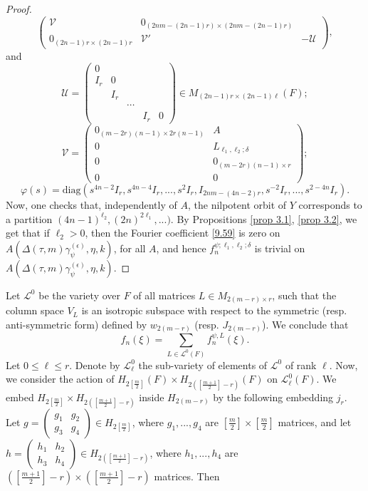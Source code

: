\documentclass[12pts]{amsart}
\newcommand{\diag}{{\mathrm{diag}}}
\newcommand{\I}{{\mathrm{I}}}
\begin{document}
\begin{proof}
$$\begin{pmatrix}
\mathcal{V}&0_{(2nm-(2n-1)r)\times (2nm-(2n-1)r)}\\0_{(2n-1)r\times
	(2n-1)r}&\mathcal{V}'&-\mathcal{U}\end{pmatrix},
$$
and
$$
\mathcal{U}=\begin{pmatrix}0\\I_r&0\\&I_r\\
&&\cdots\\&&&I_r&0\end{pmatrix}\in M_{(2n-1)r\times (2n-1)\ell}(F);
$$
$$
\mathcal{V}=\begin{pmatrix}0_{(m-2r)(n-1)\times 2r(n-1)}&A\\0&L_{\ell_1,\ell_2;\delta}\\0&0_{(m-2r)(n-1)\times r}\\0&0\end{pmatrix};
$$
$$
\varphi(s)=\diag(s^{4n-2}I_r,s^{4n-4}I_r,...,s^2I_r, 
I_{2nm-(4n-2)r},s^{-2}I_r,...,s^{2-4n}I_r).
$$	
Now, one checks that, independently of $A$, the nilpotent orbit of $Y$ corresponds to a partition $(4n-1)^{\ell_2}, (2n)^{2\ell_1},...)$. By Propositions \ref{prop 3.1}, \ref{prop 3.2}, we get that if $\ell_2>0$, then the Fourier coefficient \eqref{9.59} is zero on $A(\Delta(\tau,m)\gamma_\psi^{(\epsilon)},\eta,k)$, for all $A$, and hence  $f_n^{\psi;\ell_1,\ell_2;\delta}$ is trivial on $A(\Delta(\tau,m)\gamma_\psi^{(\epsilon)},\eta,k)$.	
\end{proof}
Let $\mathcal{L}^0$ be the variety over $F$ of all matrices $L\in M_{2(m-r)\times r}$, such that the column space $V_L$ is an isotropic subspace with respect to the symmetric (resp. anti-symmetric form) defined by $w_{2(m-r)}$ (resp. $J_{2(m-r)}$). We conclude that
\begin{equation}\label{9.60}
f_n(\xi)=\sum_{L\in \mathcal{L}^0(F)}f_n^{\psi,L}(\xi).
\end{equation}
Let $0\leq \ell\leq r$. Denote by $\mathcal{L}^0_\ell$ the sub-variety of elements of $\mathcal{L}^0$ of rank $\ell$. Now, we consider the action of $H_{2[\frac{m}{2}]}(F)\times H_{2([\frac{m+1}{2}]-r)}(F)$ on $\mathcal{L}^0_\ell(F)$. We embed $H_{2[\frac{m}{2}]}\times H_{2([\frac{m+1}{2}]-r)}$ inside $H_{2(m-r)}$ by the following embedding $j_r$. Let $g=\begin{pmatrix}g_1&g_2\\g_3&g_4\end{pmatrix}\in H_{2[\frac{m}{2}]}$, where $g_1,...,g_4$ are $[\frac{m}{2}]\times [\frac{m}{2}]$ matrices, and let $h=\begin{pmatrix}h_1&h_2\\h_3&h_4\end{pmatrix}\in H_{2([\frac{m+1}{2}]-r)}$, where $h_1,...,h_4$ are $([\frac{m+1}{2}]-r)\times ([\frac{m+1}{2}]-r)$ matrices. Then
\end{document}
